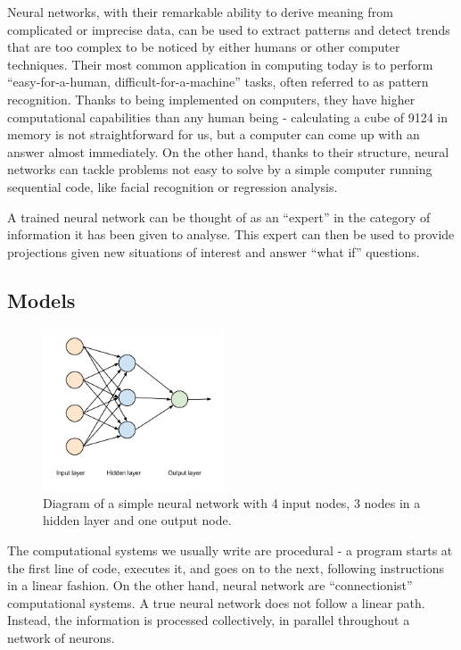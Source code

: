 Neural networks, with their remarkable ability to derive meaning from complicated or imprecise data, can be used to extract patterns and detect trends that are too complex to be noticed by either humans or other computer techniques. Their most common application in computing today is to perform ``easy-for-a-human, difficult-for-a-machine'' tasks, often referred to as pattern recognition. Thanks to being implemented on computers, they have higher computational capabilities than any human being - calculating a cube of 9124 in memory is not straightforward for us, but a computer can come up with an answer almost immediately. On the other hand, thanks to their structure, neural networks can tackle problems not easy to solve by a simple computer running sequential code, like facial recognition or regression analysis.

A trained neural network can be thought of as an ``expert'' in the category of information it has been given to analyse. This expert can then be used to provide projections given new situations of interest and answer ``what if'' questions.

\vspace{10pt}

\subsection{Models}

\begin{figure}
  \vspace{-30pt}
  \begin{center}
    \includegraphics[width=0.48\textwidth]{Figures/simpleANN}
  \end{center}
  \caption{Diagram of a simple neural network with 4 input nodes, 3 nodes in a hidden layer and one output node.}
  \label{fig:examplennn}
\end{figure}

The computational systems we usually write are procedural - a program starts at the first line of code, executes it, and goes on to the next, following instructions in a linear fashion.
On the other hand, neural network are ``connectionist'' computational systems. A true neural network does not follow a linear path. Instead, the information is processed collectively, in parallel throughout a network of neurons.

